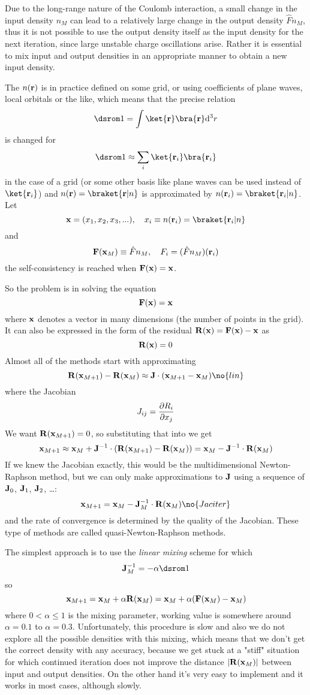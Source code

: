 Due to the long-range nature of the Coulomb interaction, a small change in the
input density $n_M$ can lead to a relatively large change in the output density
$\hat F n_M$, thus it is not possible to use the output density itself as the
input density for the next iteration, since large unstable charge oscillations
arise.  Rather it is essential to mix input and output densities in an
appropriate manner to obtain a new input density. 

\def\F{{\bf F}}
\def\R{{\bf R}}
\def\J{{\bf J}}
\def\x{{\bf x}}
\def\y{{\bf y}}
The $n(\bf r)$ is in practice defined on some grid, or using
coefficients of plane waves, local orbitals or the like, which means that the
precise relation
$$\one=\int \ket{\bf r}\bra{\bf r}\d^3 r$$ is 
changed for
$$\one\approx\sum_i \ket{{\bf r}_i}\bra{{\bf r}_i}$$ 
in the case of a grid (or some other basis like plane waves can be used instead
of $\ket{{\bf r}_i}$) and $n({\bf r})=\braket{{\bf r}|n}$ is approximated by
$n({\bf r}_i)=\braket{{\bf r}_i|n}$. 
Let 
$$\x=(x_1,x_2,x_3,...),\quad x_i\equiv n({\bf r}_i)=\braket{{\bf r}_i|n}$$
and
$$\F(\x_M)\equiv \hat F n_M, \quad F_i= (\hat F n_M)({\bf r}_i)$$
the self-consistency is reached when $\F(\x)=\x$.

So the problem is in solving the equation
$$\F(\x)=\x$$
where $\x$ denotes a vector in many dimensions (the number of points in the
grid). It can also be expressed in the
form of the residual $\R(\x)=\F(\x)-\x$ as
$$\R(\x)=0$$
Almost all of the methods start with approximating
$$\R(\x_{M+1})-\R(\x_M)\approx\J\cdot(\x_{M+1}-\x_M)\no{lin}$$
where the Jacobian
$$J_{ij}={\partial R_i\over\partial x_j}$$
We want $\R(\x_{M+1})=0$, so substituting that into  we
get
$$\x_{M+1}\approx\x_M+\J^{-1}\cdot(\R(\x_{M+1})-\R(\x_M))=
\x_M-\J^{-1}\cdot\R(\x_M)$$
If we knew the Jacobian exactly, this would be the multidimensional
Newton-Raphson method, but we can only make approximations to $\J$ using a
sequence of $\J_0$, $\J_1$, $\J_2$, \dots: 
$$\x_{M+1}=\x_M-\J_M^{-1}\cdot\R(\x_M)\no{Jaciter}$$
and the rate of convergence is determined by the quality of the Jacobian. These type of methods are called quasi-Newton-Raphson methods. 

The simplest approach is to use the {\it linear mixing\/} scheme for which
$$\J_M^{-1}=-\alpha\one$$
so
$$\x_{M+1}=\x_M+\alpha\R(\x_M)=\x_M+\alpha(\F(\x_M)-\x_M)$$
where $0<\alpha\le1$ is the mixing parameter, working value is somewhere
around $\alpha=0.1$ to $\alpha=0.3$.
Unfortunately, this procedure is slow and also we do not explore all 
the possible densities with this mixing, which means that we don't
get the correct density with any accuracy, because we get stuck at a "stiff"
situation for which continued iteration does not improve the distance 
$|\R(\x_M)|$ between input and output densities. On the other hand it's very
easy to implement and it works in most cases, although slowly.

